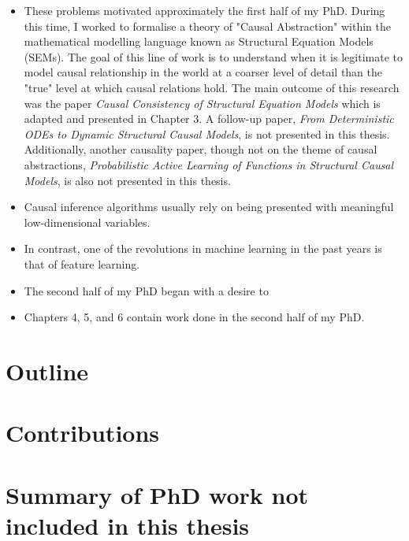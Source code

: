 \begin{itemize}
\item These problems motivated approximately the first half of my PhD. During this time, I worked to formalise a theory of "Causal Abstraction" within the mathematical modelling language known as Structural Equation Models (SEMs). The goal of this line of work is to understand when it is legitimate to model causal relationship in the world at a coarser level of detail than the "true" level at which causal relations hold. The main outcome of this research was the paper \emph{Causal Consistency of Structural Equation Models} which is adapted and presented in Chapter 3. A follow-up paper, \emph{From Deterministic ODEs to Dynamic Structural Causal Models}, is not presented in this thesis. Additionally, another causality paper, though not on the theme of causal abstractions, \emph{Probabilistic Active Learning of Functions in Structural Causal Models}, is also not presented in this thesis.
\item Causal inference algorithms usually rely on being presented with meaningful low-dimensional variables. 
\item In contrast, one of the revolutions in machine learning in the past years is that of feature learning. 
\item The second half of my PhD began with a desire to 
\item Chapters 4, 5, and 6 contain work done in the second half of my PhD. 
\end{itemize}


\section{Outline}

\section{Contributions}

\section{Summary of PhD work not included in this thesis}






















